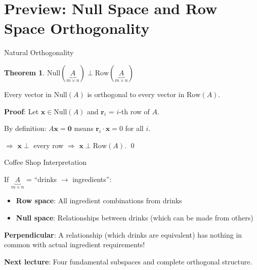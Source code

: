\documentclass[10pt]{beamer}
\theoremstyle{definition}
\newtheorem{thm}{Theorem}[section]
\newcommand{\x}[1]{\alert{\textbf{#1}}}
\begin{document}
\section{Preview: Null Space and Row Space Orthogonality}

\begin{frame}{Natural Orthogonality}

\begin{thm}
$\text{Null}(\underbrace{A}_{m \times n}) \perp \text{Row}(\underbrace{A}_{m \times n})$

Every vector in $\text{Null}(A)$ is orthogonal to every vector in $\text{Row}(A)$.
\end{thm}

\vspace{1em}

\x{Proof}: Let $\mathbf{x} \in \text{Null}(A)$ and $\mathbf{r}_i$ = $i$-th row of $A$.

By definition: $A\mathbf{x} = \mathbf{0}$ means $\mathbf{r}_i \cdot \mathbf{x} = 0$ for all $i$.

$\Rightarrow$ $\mathbf{x} \perp$ every row $\Rightarrow$ $\mathbf{x} \perp \text{Row}(A)$. \qed

\end{frame}

\begin{frame}{Coffee Shop Interpretation}

If $\underbrace{A}_{m \times n}$ = ``drinks $\to$ ingredients'':

\begin{itemize}
\item \textbf{Row space}: All ingredient combinations from drinks
\item \textbf{Null space}: Relationships between drinks (which can be made from others)
\end{itemize}

\vspace{1em}

\x{Perpendicular}: A relationship (which drinks are equivalent) has nothing in common with actual ingredient requirements!

\vspace{1em}

\x{Next lecture}: Four fundamental subspaces and complete orthogonal structure.

\end{frame}
\end{document}
